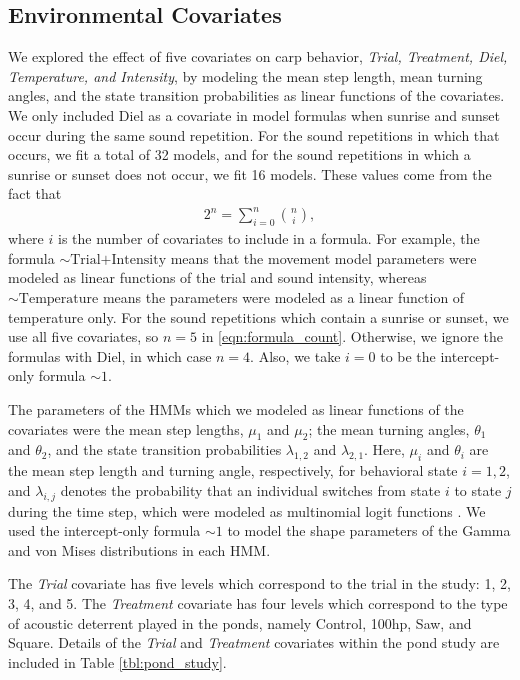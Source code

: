 \documentclass[12pt]{article}
\begin{document}
	\subsection{Environmental Covariates}
	
	We explored the effect of five covariates on carp behavior, \emph{Trial, Treatment, Diel, Temperature, and Intensity}, by modeling the mean step length, mean turning angles, and the state transition probabilities as linear functions of the covariates.	We only included Diel as a covariate in model formulas when sunrise and sunset occur during the same sound repetition. For the sound repetitions in which that occurs, we fit a total of 32 models, and for the sound repetitions in which a sunrise or sunset does not occur, we fit 16 models. These values come from the fact that
	\begin{align}
		2^n = \sum_{i=0}^n \binom{n}{i}, \label{eqn:formula_count}
	\end{align}
	where $i$ is the number of covariates to include in a formula. For example, the formula $\sim \! \text{Trial+Intensity}$ means that the movement model parameters were modeled as linear functions of the trial and sound intensity, whereas $\sim \! \text{Temperature}$ means the parameters were modeled as a linear function of temperature only. For the sound repetitions which contain a sunrise or sunset, we use all five covariates, so $n = 5$ in \eqref{eqn:formula_count}. Otherwise, we ignore the formulas with Diel, in which case $n = 4$. Also, we take $i = 0$ to be the intercept-only formula $\sim \! 1$.
	
	The parameters of the HMMs which we modeled as linear functions of the covariates were the mean step lengths, $\mu_1$ and $\mu_2$; the mean turning angles, $\theta_1$ and $\theta_2$, and the state transition probabilities $\lambda_{1,2}$ and $\lambda_{2, 1}$. Here, $\mu_i$ and $\theta_i$ are the mean step length and turning angle, respectively, for behavioral state $i = 1, 2$, and $\lambda_{i, j}$ denotes the probability that an individual switches from state $i$ to state $j$ during the time step, which were modeled as multinomial logit functions \cite{Michelot2016}. We used the intercept-only formula $\sim \! 1$ to model the shape parameters of the Gamma and von Mises distributions in each HMM.
	
	The \emph{Trial} covariate has five levels which correspond to the trial in the study: 1, 2, 3, 4, and 5. The \emph{Treatment} covariate has four levels which correspond to the type of acoustic deterrent played in the ponds, namely Control, 100hp, Saw, and Square. Details of the \emph{Trial} and \emph{Treatment} covariates within the pond study are included in Table \ref{tbl:pond_study}.
	
\end{document}
